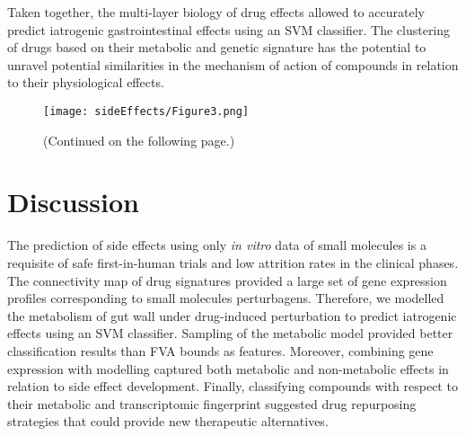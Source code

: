 Taken together, the multi-layer biology of drug effects allowed to accurately predict iatrogenic gastrointestinal effects using an SVM classifier. The clustering of drugs based on their metabolic and genetic signature has the potential to unravel potential similarities in the mechanism of action of compounds in relation to their physiological effects.
\begin{figure}[!htp]
\centering
	\texttt{[image: sideEffects/Figure3.png]}%
	\caption[Prediction of individual side effect labels.]{(Continued on the following page.)}
	\label{fig:seff3}
\end{figure}
\begin{figure}[t]
\end{figure}
\section{Discussion}
The prediction of side effects using only \textit{in vitro} data of small molecules is a requisite of safe first-in-human trials and low attrition rates in the clinical phases.  The connectivity map of drug signatures \cite{subramanian2017next} provided a large set of gene expression profiles corresponding to small molecules perturbagens. Therefore, we modelled the metabolism of gut wall under drug-induced perturbation to predict iatrogenic effects using an SVM classifier. Sampling of the metabolic model provided better classification results than FVA bounds as features. Moreover, combining gene expression with modelling captured both metabolic and non-metabolic effects in relation to side effect development. Finally, classifying compounds with respect to their metabolic and transcriptomic fingerprint suggested drug repurposing strategies that could provide new therapeutic alternatives.
